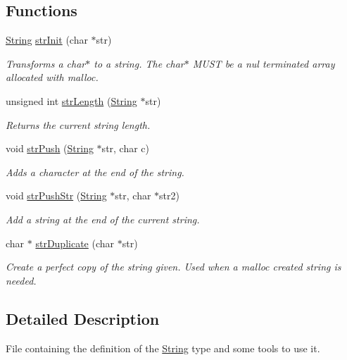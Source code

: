 \subsection*{Functions}
\begin{DoxyCompactItemize}
\item 
\hyperlink{struct_string}{String} \hyperlink{string-type_8h_ab9893f2c904ee5ff139589712c1284d1}{str\+Init} (char $\ast$str)
\begin{DoxyCompactList}\small\item\em Transforms a char$\ast$ to a string. The char$\ast$ M\+U\+ST be a nul terminated array allocated with malloc. \end{DoxyCompactList}\item 
unsigned int \hyperlink{string-type_8h_a6c362d400c8b2016bc08876470e2d00d}{str\+Length} (\hyperlink{struct_string}{String} $\ast$str)
\begin{DoxyCompactList}\small\item\em Returns the current string length. \end{DoxyCompactList}\item 
void \hyperlink{string-type_8h_ae3068dd8c60d7a42a93f0351ef8f09e1}{str\+Push} (\hyperlink{struct_string}{String} $\ast$str, char c)
\begin{DoxyCompactList}\small\item\em Adds a character at the end of the string. \end{DoxyCompactList}\item 
void \hyperlink{string-type_8h_a9ba8f8e2307743ae902d0c31042bfb08}{str\+Push\+Str} (\hyperlink{struct_string}{String} $\ast$str, char $\ast$str2)
\begin{DoxyCompactList}\small\item\em Add a string at the end of the current string. \end{DoxyCompactList}\item 
char $\ast$ \hyperlink{string-type_8h_ae28db08bad9d3c4511ab5241534a89c0}{str\+Duplicate} (char $\ast$str)
\begin{DoxyCompactList}\small\item\em Create a perfect copy of the string given. Used when a malloc created string is needed. \end{DoxyCompactList}\end{DoxyCompactItemize}


\subsection{Detailed Description}
File containing the definition of the \hyperlink{struct_string}{String} type and some tools to use it. 

